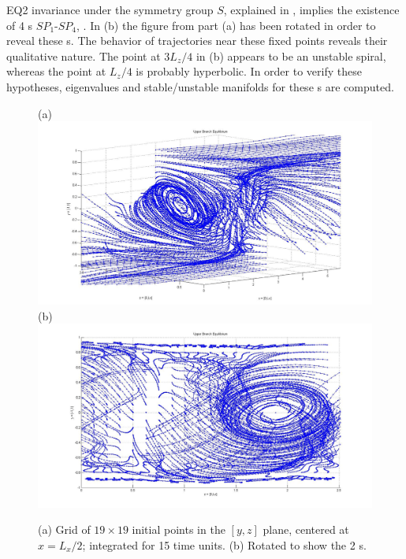 \documentclass[letter,10pt,openany]{article}
\begin{document}
EQ2 invariance under the symmetry group $S$, explained  in
, implies the existence of 4 \stagp s $SP_1$-$SP_4$,
.
In (b) the figure
from part (a) has been rotated in order
to reveal these \stagp s. The behavior of trajectories near these
fixed points reveals their  qualitative nature.
The point at $3L_z/4$ in (b) appears to be an
unstable spiral, whereas the point at $L_z/4$ is probably hyperbolic. In order to verify these hypotheses, eigenvalues and
stable/unstable manifolds for these \stagp s are computed. \\


\begin{figure}[!h]
(a)\includegraphics[width=1.0\textwidth ]{fig_UB1.jpg}
(b)\includegraphics[width=1.0\textwidth]{fig_UB1eq.jpg}
  \caption{
  (a) {Grid of $19 \times 19$  initial points in the $[y,z]$ plane,
centered at $x = L_x/2$; integrated for 15 time units.}
    (b) { Rotated to show the 2 \stagp s}.
      }
  \label{eltonFig:UBs}
 \end{figure}
\end{document}

